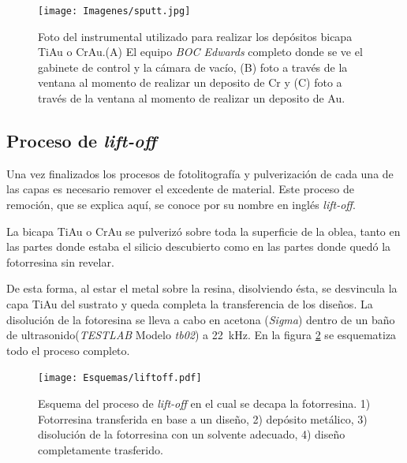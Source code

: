 		   		  \begin{figure}[h!]
				  \begin{center}
				  \texttt{[image: Imagenes/sputt.jpg]}
				  \caption[Equipo para depósito de películas delgadas, \textit{sputtering}]{Foto del instrumental utilizado para realizar los depósitos bicapa Ti\textbar Au o Cr\textbar Au.(A) El equipo \textit{BOC Edwards} completo donde se ve el gabinete de control y la cámara de vacío, (B) foto a través de la ventana al momento de realizar un deposito de Cr y (C) foto a través de la ventana al momento de realizar un deposito de Au.}
				  \label{fig:sputt}
				  \end{center}
				  \end{figure}

	\vspace*{-1.0cm}\subsection{Proceso de\textit{ lift-off}}\label{sec:liffff}

   	     Una vez finalizados los procesos de fotolitografía y pulverización de cada una de las capas es necesario remover el excedente de material. Este proceso de remoción, que se explica aquí, se conoce por su nombre en inglés \textit{lift-off}.

		 La bicapa Ti\textbar Au o Cr\textbar Au se pulverizó sobre toda la superficie de la oblea, tanto en las partes donde estaba el silicio descubierto como en las partes donde quedó la fotorresina sin revelar. 
		
		 De esta forma, al estar el metal sobre la resina, disolviendo ésta, se desvincula la capa Ti\textbar Au del sustrato y queda completa la transferencia de los diseños. 
		 La disolución de la fotoresina se lleva a cabo en acetona (\textit{Sigma}) dentro de un baño de ultrasonido(\textit{TESTLAB} Modelo \textit{tb02}) a \SI{22}{\kHz}. En la figura \ref{esq:liftoff} se esquematiza todo el proceso completo.

		 	\begin{figure}[t!]
			  \begin{center}
			  \texttt{[image: Esquemas/liftoff.pdf]}
			  \caption[Esquema del proceso de\textit{ lift-off}]{Esquema del proceso de\textit{ lift-off} en el cual se decapa la fotorresina. 1) Fotorresina transferida en base a un diseño, 2) depósito metálico, 3) disolución de la fotorresina con un solvente adecuado, 4) diseño completamente trasferido.}
			  \label{esq:liftoff}
			  \end{center}
			  \end{figure}

